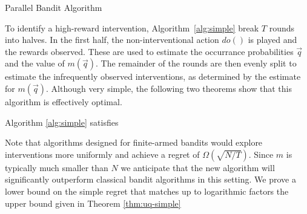\begin{algorithm}[h]
\caption{Parallel Bandit Algorithm}\label{alg:simple}
\end{algorithm}

To identify a high-reward intervention, Algorithm~\ref{alg:simple} break $T$ rounds into halves. 
In the first half, the non-interventional action $do()$ is played and the rewards observed.
These are used to estimate the occurrance probabilities $$ and the value of $m()$.
The remainder of the rounds are then evenly split to estimate the infrequently observed interventions, as determined by the estimate for $m()$.
Although very simple, the following two theorems show that this algorithm is effectively optimal.

\begin{theorem}\label{thm:uq-simple}
Algorithm \ref{alg:simple} satisfies
\end{theorem}

Note that algorithms designed for finite-armed bandits would explore interventions more uniformly and achieve a regret of $\Omega()$.
Since $m$ is typically much smaller than $N$ we anticipate that the new algorithm will significantly outperform classical bandit algorithms in
this setting.
We prove a lower bound on the simple regret that matches up to logarithmic factors the upper bound given in Theorem \ref{thm:uq-simple}


